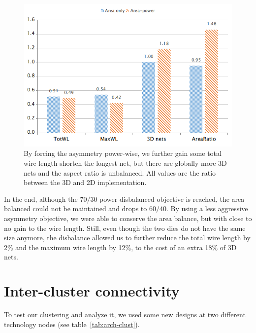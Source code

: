 \documentclass[11pt,a4paper]{report} %
\theoremstyle{customdef}
\begin{document}
\begin{figure}[!h]
\centering
\includegraphics[width=.8\textwidth]{img/res-asym-power}
\caption{By forcing the asymmetry power-wise, we further gain some total wire length shorten the longest net, but there are globally more 3D nets and the aspect ratio is unbalanced. All values are the ratio between the 3D and 2D implementation.}
\label{fig:res-asym}
\end{figure}

In the end, although the $70/30$ power disbalanced objective is reached, the area balanced could not be maintained and drops to $60/40$.
By using a less aggressive asymmetry objective, we were able to conserve the area balance, but with close to no gain to the wire length.
Still, even though the two dies do not have the same size anymore, the disbalance allowed us to further reduce the total wire length by 2\% and the maximum wire length by 12\%, to the cost of an extra 18\% of 3D nets.








\section{Inter-cluster connectivity}\label{sec:res-intercl}
To test our clustering and analyze it, we used some new designs at two different technology nodes (see table~\ref{tab:arch-clust}).
\end{document}
